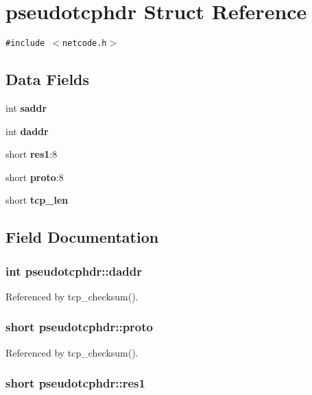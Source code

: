 \section{pseudotcphdr Struct Reference}
\label{structpseudotcphdr}
{\tt \#include $<$netcode.h$>$}

\subsection*{Data Fields}
\begin{CompactItemize}
\item 
int {\bf saddr}
\item 
int {\bf daddr}
\item 
short {\bf res1}:8
\item 
short {\bf proto}:8
\item 
short {\bf tcp\_\-len}
\end{CompactItemize}


\subsection{Field Documentation}
\subsubsection[{daddr}]{\setlength{\rightskip}{0pt plus 5cm}int {\bf pseudotcphdr::daddr}}\label{structpseudotcphdr_daeb96deb63cb012de5faf33a6aaf5e0}




Referenced by tcp\_\-checksum().
\subsubsection[{proto}]{\setlength{\rightskip}{0pt plus 5cm}short {\bf pseudotcphdr::proto}}\label{structpseudotcphdr_98818a8ef48e84ac07db282fad30ed7e}




Referenced by tcp\_\-checksum().
\subsubsection[{res1}]{\setlength{\rightskip}{0pt plus 5cm}short {\bf pseudotcphdr::res1}}\label{structpseudotcphdr_3640294f0e359f4495a33aca6e140803}




